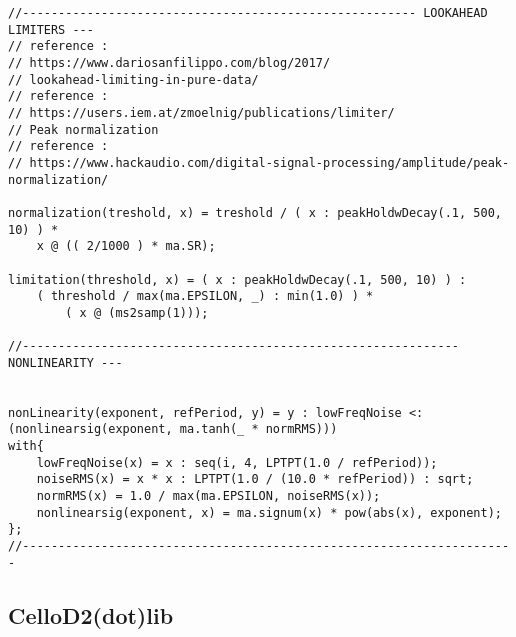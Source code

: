 \begin{lstlisting}
//------------------------------------------------------- LOOKAHEAD LIMITERS ---
// reference :
// https://www.dariosanfilippo.com/blog/2017/
// lookahead-limiting-in-pure-data/
// reference :
// https://users.iem.at/zmoelnig/publications/limiter/
// Peak normalization
// reference :
// https://www.hackaudio.com/digital-signal-processing/amplitude/peak-normalization/

normalization(treshold, x) = treshold / ( x : peakHoldwDecay(.1, 500, 10) ) *
    x @ (( 2/1000 ) * ma.SR);

limitation(threshold, x) = ( x : peakHoldwDecay(.1, 500, 10) ) : 
    ( threshold / max(ma.EPSILON, _) : min(1.0) ) *
        ( x @ (ms2samp(1)));

//------------------------------------------------------------- NONLINEARITY ---


nonLinearity(exponent, refPeriod, y) = y : lowFreqNoise <: (nonlinearsig(exponent, ma.tanh(_ * normRMS)))
with{
    lowFreqNoise(x) = x : seq(i, 4, LPTPT(1.0 / refPeriod));
    noiseRMS(x) = x * x : LPTPT(1.0 / (10.0 * refPeriod)) : sqrt;
    normRMS(x) = 1.0 / max(ma.EPSILON, noiseRMS(x));
    nonlinearsig(exponent, x) = ma.signum(x) * pow(abs(x), exponent);
};
//---------------------------------------------------------------------
\end{lstlisting}

\subsection{CelloD2(dot)lib}

